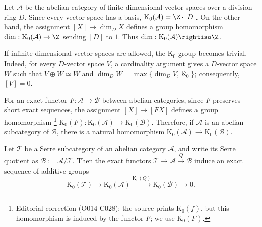 \begin{example}
Let $\mathcal{A}$ be the abelian category of finite-dimensional vector spaces
over a division ring $D$. Since every vector space has a basis,
$\mathrm{K}_0(\mathcal{A})=\Z\cdot[D]$. On the other hand, the assignment
$[X]\mapsto\dim_D X$ defines a group homomorphism
$\dim:\mathrm{K}_0(\mathcal{A})\to\Z$ sending $[D]$ to $1$. Thus
$\dim:\mathrm{K}_0(\mathcal{A})\rightiso\Z$.

If infinite-dimensional vector spaces are allowed, the $\mathrm{K}_0$ group
becomes trivial. Indeed, for every $D$-vector space $V$, a cardinality
argument gives a $D$-vector space $W$ such that $V\oplus W\simeq W$ and
$\dim_D W=\max\{\dim_D V,\aleph_0\}$; consequently, $[V]=0$.
\end{example}

For an exact functor $F:\mathcal{A}\to\mathcal{B}$ between abelian
categories, since $F$ preserves short exact sequences, the assignment
$[X]\mapsto[FX]$ defines a group homomorphism
\footnote{Editorial correction (O014-C028): the source prints
$\mathrm{K}_0(f)$, but this homomorphism is induced by the functor $F$; we use
$\mathrm{K}_0(F)$.}
$\mathrm{K}_0(F):\mathrm{K}_0(\mathcal{A})
\to\mathrm{K}_0(\mathcal{B})$.
Therefore, if $\mathcal{A}$ is an abelian subcategory of $\mathcal{B}$, there
is a natural homomorphism
$\mathrm{K}_0(\mathcal{A})\to\mathrm{K}_0(\mathcal{B})$.

\begin{proposition}\label{prop:K0-exact-seq}
Let $\mathcal{T}$ be a Serre subcategory of an abelian category
$\mathcal{A}$, and write its Serre quotient as
$\mathcal{B}:=\mathcal{A}/\mathcal{T}$. Then the exact functors
$\mathcal{T}\to\mathcal{A}\xrightarrow{Q}\mathcal{B}$ induce an exact
sequence of additive groups
\[\mathrm{K}_0(\mathcal{T})\to\mathrm{K}_0(\mathcal{A})
\xrightarrow{\mathrm{K}_0(Q)}\mathrm{K}_0(\mathcal{B})\to0.\]
\end{proposition}

